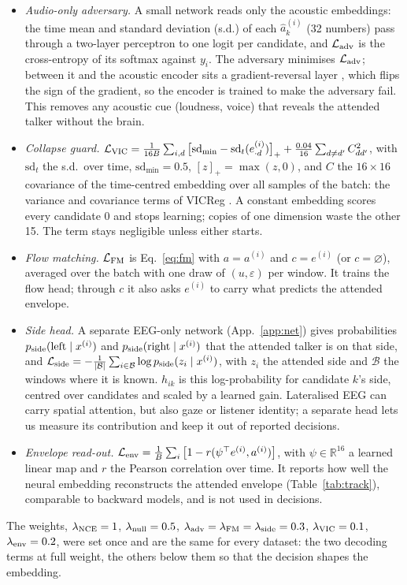 \documentclass[twoside]{article}
\begin{document}
\begin{itemize}
\item \emph{Audio-only adversary.} A small network reads only the acoustic embeddings: the
time mean and standard deviation (s.d.) of each $\hat a^{(i)}_k$ (32 numbers) pass through a two-layer
perceptron to one logit per candidate, and $\mathcal L_{\rm adv}$ is the cross-entropy of its
softmax against $y_i$. The adversary minimises $\mathcal L_{\rm adv}$; between it and the
acoustic encoder sits a gradient-reversal layer \citep{ganin2016domain}, which flips the
sign of the gradient, so the encoder is trained to make the adversary fail. This removes
any acoustic cue (loudness, voice) that reveals the attended talker without the brain.
\item \emph{Collapse guard.} $\mathcal L_{\rm VIC}=\frac{1}{16B}\sum_{i,d}\big[\mathrm{sd}_{\min}-
\mathrm{sd}_t(e^{(i)}_{\cdot d})\big]_+ +\frac{0.04}{16}\sum_{d\neq d'}C_{dd'}^2$, with
$\mathrm{sd}_t$ the s.d.\ over time, $\mathrm{sd}_{\min}=0.5$,
$[z]_+=\max(z,0)$, and $C$ the $16\times16$ covariance of the time-centred embedding over
all samples of the batch: the variance and covariance terms of VICReg
\citep{bardes2022vicreg}. A constant embedding scores every candidate 0 and stops learning;
copies of one dimension waste the other 15. The term stays negligible unless either starts.
\item \emph{Flow matching.} $\mathcal L_{\rm FM}$ is Eq.~\ref{eq:fm} with $a=a^{(i)}$ and
$c=e^{(i)}$ (or $c=\varnothing$), averaged over the batch with one draw of $(u,\varepsilon)$
per window. It trains the flow head; through $c$ it also asks $e^{(i)}$ to carry what predicts
the attended envelope.
\item \emph{Side head.} A separate EEG-only network (App.~\ref{app:net}) gives probabilities
$p_{\rm side}(\text{left}\mid x^{(i)})$ and $p_{\rm side}(\text{right}\mid x^{(i)})$ that the
attended talker is on that side, and $\mathcal L_{\rm side}=-\frac{1}{|\mathcal B|}
\sum_{i\in\mathcal B}\log p_{\rm side}(z_i\mid x^{(i)})$, with $z_i$ the attended side and
$\mathcal B$ the windows where it is known. $h_{ik}$ is this log-probability for candidate
$k$'s side, centred over candidates and scaled by a learned gain. Lateralised EEG can carry
spatial attention, but also gaze or listener identity; a separate head lets us measure its
contribution and keep it out of reported decisions.
\item \emph{Envelope read-out.} $\mathcal L_{\rm env}=\frac1B\sum_i\big[1-r(\psi^\top
e^{(i)},a^{(i)})\big]$, with $\psi\in\mathbb R^{16}$ a learned linear map and $r$ the Pearson
correlation over time. It reports how well the neural embedding reconstructs the attended
envelope (Table~\ref{tab:track}), comparable to backward models, and is not used in decisions.
\end{itemize}
The weights, $\lambda_{\rm NCE}=1$, $\lambda_{\rm null}=0.5$,
$\lambda_{\rm adv}=\lambda_{\rm FM}=\lambda_{\rm side}=0.3$, $\lambda_{\rm VIC}=0.1$,
$\lambda_{\rm env}=0.2$, were set once and are the same for every dataset: the two decoding
terms at full weight, the others below them so that the decision shapes the embedding.
\end{document}
